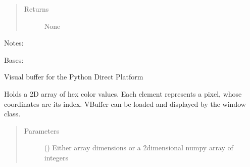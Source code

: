 \documentclass[letterpaper,10pt,english]{sphinxmanual}
\begin{document}
\begin{fulllineitems}
\begin{fulllineitems}
\begin{quote}
\begin{description}
\item[{Returns}] \leavevmode
\sphinxAtStartPar
None

\end{description}\end{quote}

\sphinxAtStartPar
Notes:

\end{fulllineitems}


\end{fulllineitems}


\begin{fulllineitems}
\label{\detokenize{dpav:dpav.VBuffer}}
\pysigstartsignatures
{}
\pysigstopsignatures
\sphinxAtStartPar
Bases: 

\sphinxAtStartPar
Visual buffer for the Python Direct Platform

\sphinxAtStartPar
Holds a 2D array of hex color values. Each element represents a pixel,
whose coordinates are its index. VBuffer can be loaded and displayed by
the window class.
\begin{quote}\begin{description}
\item[{Parameters}] \leavevmode
\sphinxAtStartPar
{} (\sphinxstyleliteralemphasis{\sphinxupquote{\{}}\sphinxstyleliteralemphasis{\sphinxupquote{(}}\sphinxstyleliteralemphasis{\sphinxupquote{, }}\sphinxstyleliteralemphasis{\sphinxupquote{)}}\sphinxstyleliteralemphasis{\sphinxupquote{|}}\sphinxstyleliteralemphasis{\sphinxupquote{(}}\sphinxstyleliteralemphasis{\sphinxupquote{, }}\sphinxstyleliteralemphasis{\sphinxupquote{)}}\sphinxstyleliteralemphasis{\sphinxupquote{\}}}) \textendash{} 
\sphinxAtStartPar
Either array dimensions or a 2\sphinxhyphen{}dimensional numpy array of integers


\end{description}
\end{quote}
\end{fulllineitems}
\end{document}
